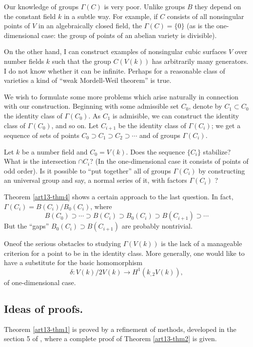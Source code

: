 Our knowledge of groups $\Gamma(C)$ is very poor. Unlike groups $B$ they depend on the constant field $k$ in a subtle way. For example, if $C$ consists of all nonsingular points of $V$ in an algebraically closed field, the $\Gamma(C)=\{0\}$ (as is the one-dimensional case: the group of points of an abelian variety is divisible).

On the other hand, I can construct examples of nonsingular cubic surfaces $V$ over number fields $k$ such that the group $C(V(k))$ has arbitrarily many generators. I do not know whether it can be infinite. Perhaps for a reasonable class of varieties a kind of ``weak Mordell-Weil theorem'' is true.

We wish to formulate some more problems which arise naturally in connection with our construction. Beginning with some admissible set $C_{0}$, denote by $C_{1}\subset C_{0}$ the identity class of $\Gamma(C_{0})$. As $C_{1}$ is admisible, we can construct the identity class of $\Gamma(C_{0})$, and so on. Let $C_{i+1}$ be the identity class of $\Gamma(C_{i})$; we get a sequence of sets of points $C_{0}\supset C_{1}\supset C_{2}\supset \cdots$ and of groups $\Gamma(C_{i})$.

Let $k$ be a number field and $C_{0}=V(k)$. Does the sequence $\{C_{i}\}$ stabilize? What is the intersection $\cap C_{i}$? (In the one-dimensional case it consists of points of odd order). Is it possible to ``put together'' all of groups $\Gamma(C_{i})$ by constructing an universal group and say, a normal series of it, with factors $\Gamma(C_{i})$ ?

Theorem \ref{art13-thm4} shows a certain approach to the last question. In fact, $\Gamma(C_{i})=B(C_{i})/B_{0}(C_{i})$, where
$$
B(C_{0})\supset\cdots\supset B(C_{i})\supset B_{0}(C_{i})\supset B(C_{i+1})\supset \cdots
$$
But the ``gaps'' $B_{0}(C_{i})\supset B(C_{i+1})$ are probably nontrivial.

One\pageoriginale of the serious obstacles to studying $\Gamma(V(k))$ is the lack of a manageable criterion for a point to be in the identity class. More generally, one would like to have a substitute for the basic homomorphism
$$
\delta : V(k)/2V(k)\to H^{1}(k_{,2}V(k)),
$$
of one-dimensional case.

\subsection*{Ideas of proofs.}
Theorem \ref{art13-thm1} is proved by a refinement of methods, developed in the section 5 of \cite{art13-key2}, where a complete proof of Theorem \ref{art13-thm2} is given.


